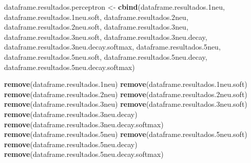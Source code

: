 \documentclass[]{article}
\newenvironment{Shaded}{\begin{snugshade}}{\end{snugshade}}
\newcommand{\FloatTok}[1]{\textcolor[rgb]{0.00,0.00,0.81}{#1}}
\newcommand{\KeywordTok}[1]{\textcolor[rgb]{0.13,0.29,0.53}{\textbf{#1}}}
\newcommand{\NormalTok}[1]{#1}
\newcommand{\StringTok}[1]{\textcolor[rgb]{0.31,0.60,0.02}{#1}}
\begin{document}
\begin{Shaded}
\begin{Highlighting}[]
\NormalTok{dataframe.resultados.perceptron <-}\StringTok{ }\KeywordTok{cbind}\NormalTok{(dataframe.resultados}\FloatTok{.1}\NormalTok{neu,}
\NormalTok{                                         dataframe.resultados}\FloatTok{.1}\NormalTok{neu.soft,}
\NormalTok{                                         dataframe.resultados}\FloatTok{.2}\NormalTok{neu,}
\NormalTok{                                         dataframe.resultados}\FloatTok{.2}\NormalTok{neu.soft,}
\NormalTok{                                         dataframe.resultados}\FloatTok{.3}\NormalTok{neu,}
\NormalTok{                                         dataframe.resultados}\FloatTok{.3}\NormalTok{neu.soft,}
\NormalTok{                                         dataframe.resultados}\FloatTok{.3}\NormalTok{neu.decay,}
\NormalTok{                                         dataframe.resultados}\FloatTok{.3}\NormalTok{neu.decay.softmax,}
\NormalTok{                                         dataframe.resultados}\FloatTok{.5}\NormalTok{neu,}
\NormalTok{                                         dataframe.resultados}\FloatTok{.5}\NormalTok{neu.soft,}
\NormalTok{                                         dataframe.resultados}\FloatTok{.5}\NormalTok{neu.decay,}
\NormalTok{                                         dataframe.resultados}\FloatTok{.5}\NormalTok{neu.decay.softmax)}

\KeywordTok{remove}\NormalTok{(dataframe.resultados}\FloatTok{.1}\NormalTok{neu)}
\KeywordTok{remove}\NormalTok{(dataframe.resultados}\FloatTok{.1}\NormalTok{neu.soft)}
\KeywordTok{remove}\NormalTok{(dataframe.resultados}\FloatTok{.2}\NormalTok{neu)}
\KeywordTok{remove}\NormalTok{(dataframe.resultados}\FloatTok{.2}\NormalTok{neu.soft)}
\KeywordTok{remove}\NormalTok{(dataframe.resultados}\FloatTok{.3}\NormalTok{neu)}
\KeywordTok{remove}\NormalTok{(dataframe.resultados}\FloatTok{.3}\NormalTok{neu.soft)}
\KeywordTok{remove}\NormalTok{(dataframe.resultados}\FloatTok{.3}\NormalTok{neu.decay)}
\KeywordTok{remove}\NormalTok{(dataframe.resultados}\FloatTok{.3}\NormalTok{neu.decay.softmax)}
\KeywordTok{remove}\NormalTok{(dataframe.resultados}\FloatTok{.5}\NormalTok{neu)}
\KeywordTok{remove}\NormalTok{(dataframe.resultados}\FloatTok{.5}\NormalTok{neu.soft)}
\KeywordTok{remove}\NormalTok{(dataframe.resultados}\FloatTok{.5}\NormalTok{neu.decay)}
\KeywordTok{remove}\NormalTok{(dataframe.resultados}\FloatTok{.5}\NormalTok{neu.decay.softmax)}
\end{Highlighting}
\end{Shaded}
\end{document}
